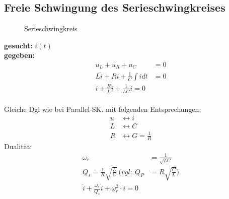 \subsection{Freie Schwingung des Serieschwingkreises}
\begin{wrapfigure}{l}{0.5\textwidth}
	\centering
	
	\caption{Serieschwingkreis}
	\label{fig:SerieSKGeschlossen}
\end{wrapfigure}

\textbf{gesucht:  }$i(t)$\\
\textbf{gegeben:}
\begin{align}
	u_L + u_R + u_C &= 0\nonumber\\
	L\dot{i} + Ri + \frac{1}{C}\int{i}dt&=0\nonumber\\
	\boxed{\ddot{i}+\frac{R}{L}\dot{i}+\frac{1}{LC}i=0}
\end{align}\\
Gleiche Dgl wie bei Parallel-SK. mit folgenden Entsprechungen:\\
\begin{align}
u &\leftrightarrow i\nonumber\\
L &\leftrightarrow C\nonumber\\
R &\leftrightarrow G=\frac{1}{R}\nonumber
\end{align}
Dualität:\\
\begin{align}
\omega_r&=\frac{1}{\sqrt{LC}}\nonumber\\
Q_s=\frac{1}{R}\sqrt{\frac{L}{C}}\ (vgl:\ Q_P&=R\sqrt{\frac{C}{L}})\nonumber\\
\boxed{\ddot i + \frac{\omega_r}{Q_s}\dot i + \omega_r^2\cdot i = 0}
\end{align}\\

